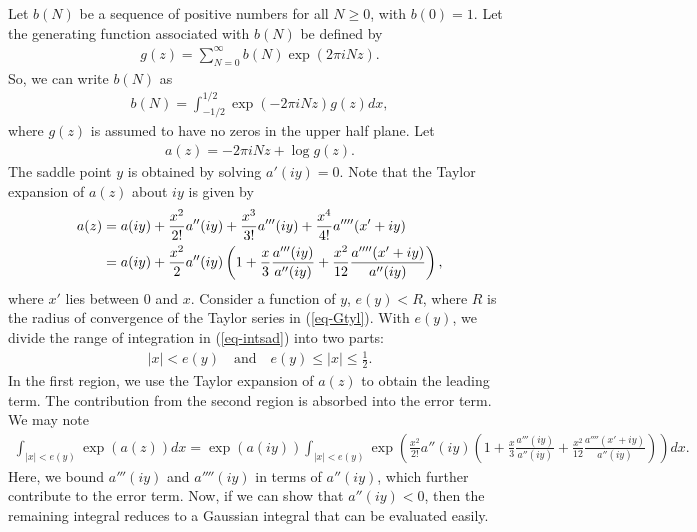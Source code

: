 \documentclass[11pt]{amsart}
\theoremstyle{plain}
\numberwithin{equation}{section}
\begin{document}
	Let $b(N)$ be a sequence of positive numbers for all $N\ge 0$, with $b(0)=1$. Let the generating function associated with $b(N)$ be defined by
	\begin{align*}
		g(z)=\sum_{N=0}^{\infty}b(N)\exp(2\pi i Nz).
	\end{align*}
	So, we can write $b(N)$ as 
	\begin{align}\label{eq-intsad}
		b(N)=\int_{-1/2}^{1/2}\exp(-2\pi iNz)g(z)dx,
	\end{align}
	where $g(z)$ is assumed to have no zeros in the upper half plane.  Let
	\begin{align*}
		a(z)=-2\pi iNz+\log g(z).
	\end{align*}
	The saddle point $y$ is obtained by solving $a'(iy)=0$. Note that the Taylor expansion of $a(z)$ about $iy$ is given by
	\begin{align}\label{eq-Gtyl}
		\notag
		a(z)&=a(iy)+\frac{x^{2}}{2!}a''(iy)+\frac{x^{3}}{3!}a'''(iy)+  \frac{x^{4}}{4!}a''''(x'+iy)\\
		&=a(iy)+\frac{x^{2}}{2}a''(iy)\left(1+\frac{x}{3}\frac{a'''(iy)}{a''(iy)}+\frac{x^{2}}{12}\frac{a''''(x'+iy)}{a''(iy)}\right),
	\end{align}
	where $x'$ lies between $0$ and $x.$
	Consider a function of $y$, $e(y)< R$, where $R$ is the radius of convergence of the Taylor series in (\ref{eq-Gtyl}). With $e(y)$, we divide the range of integration in (\ref{eq-intsad}) into two parts:
	\begin{align*}
		|x|< e(y)\quad \text{and} \quad  e(y)\le |x|\le \frac{1}{2}.
	\end{align*}
	In the first region, we use the Taylor expansion of $a(z)$ to obtain the leading term. The contribution from the second region is absorbed into the error term. We may note
	\begin{align*}
		\int_{|x|< e(y)} \exp(a(z))dx=\exp(a(iy))\int_{|x|< e(y)}\exp\left(\frac{x^{2}}{2!}a''(iy)\left(1+\frac{x}{3}\frac{a'''(iy)}{a''(iy)}+\frac{x^{2}}{12}\frac{a''''(x'+iy)}{a''(iy)}\right)  \right) dx.
	\end{align*}
	Here, we bound $a'''(iy)$ and $a''''(iy)$ in terms of $a''(iy)$, which further contribute to the error term. Now, if we can show that $a''(iy) < 0$, then the remaining integral reduces to a Gaussian integral that can be evaluated easily. 
	
	
\end{document}
